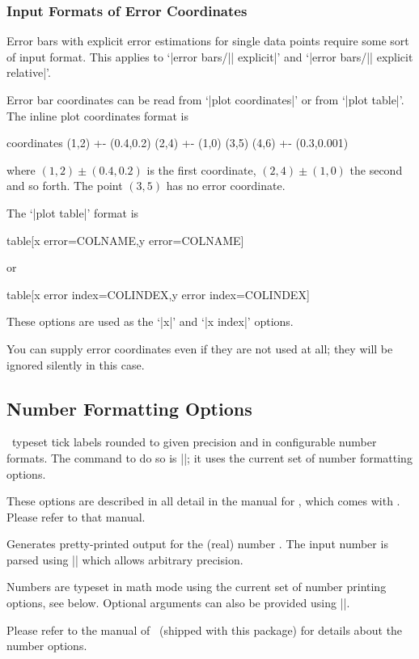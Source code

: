 {\subsubsection{Input Formats of Error Coordinates}
\label{sec:errorbar:input}%
Error bars with explicit error estimations for single data points require some sort of input format. This applies to `|error bars/|\meta{[xy]}| explicit|' and `|error bars/|\meta{[xy]}| explicit relative|'.

Error bar coordinates can be read from `|plot coordinates|' or from `|plot table|'. The inline plot coordinates format is
\begin{codeexample}
\addplot coordinates {
	(1,2) +- (0.4,0.2)
	(2,4) +- (1,0)
	(3,5)
	(4,6) +- (0.3,0.001)
}
\end{codeexample}
where $(1,2) \pm (0.4,0.2)$ is the first coordinate, $(2,4) \pm (1,0)$ the second and so forth. The point $(3,5)$ has no error coordinate.

The `|plot table|' format is
\begin{codeexample}
\addplot table[x error=COLNAME,y error=COLNAME]
\end{codeexample}
or
\begin{codeexample}
\addplot table[x error index=COLINDEX,y error index=COLINDEX]
\end{codeexample}
These options are used as the `|x|' and `|x index|' options.

You can supply error coordinates even if they are not used at all; they will be ignored silently in this case.

}%

\subsection{Number Formatting Options}
\label{sec:number:printing}%
\PGFPlots\ typeset tick labels rounded to given precision and in configurable number formats. The command to do so is |\pgfmathprintnumber|; it uses the current set of number formatting options.

These options are described in all detail in the manual for \PGFPlotstable, which comes with \PGFPlots. Please refer to that manual.

\begin{command}{\pgfmathprintnumber{}}
Generates pretty-printed output for the (real) number . The input number  is parsed using |\pgfmathfloatparsenumber| which allows arbitrary precision.

Numbers are typeset in math mode using the current set of number printing options, see below. Optional arguments can also be provided using ||.

Please refer to the manual of \PGFPlotstable\ (shipped with this package) for details about the number options.
\end{command}

